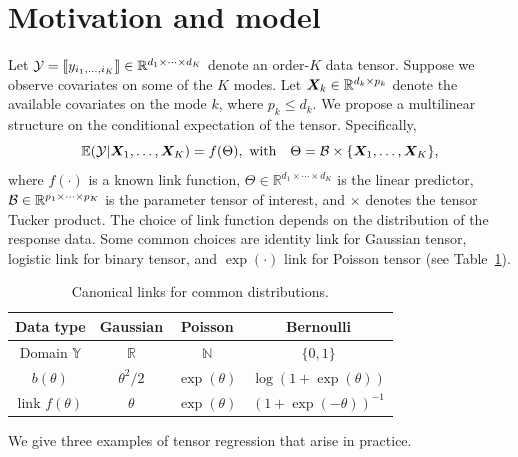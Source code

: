 \documentclass{article}
\theoremstyle{plain}
\theoremstyle{definition}
\begin{document}
\section{Motivation and model}\label{sec:model}
Let $\mathcal{Y}=\llbracket y_{i_1,\ldots,i_K} \rrbracket\in\mathbb{R}^{d_1\times \cdots\times d_K}$ denote an order-$K$ data tensor. Suppose we observe covariates on some of the $K$ modes. Let $\bm X_k\in\mathbb{R}^{d_k\times p_k}$ denote the available covariates on the mode $k$, where $p_k\leq d_k$. We propose a multilinear structure on the conditional expectation of the tensor. Specifically, 
\begin{equation}\label{eq:tensormodel}
\mathbb{E}(\mathcal{Y}|\bm X_1,\ldots,\bm X_K)=f(\Theta),\ \text{with}\quad
\Theta =\mathcal{B}\times\{\bm X_1,\ldots,\bm X_K\} ,
\end{equation}
where $f(\cdot)$ is a known link function, $\Theta\in\mathbb{R}^{d_1\times \cdots\times d_K}$ is the linear predictor, $\mathcal{B}\in\mathbb{R}^{p_1\times \cdots \times p_K}$ is the parameter tensor of interest, and $\times$ denotes the tensor Tucker product. The choice of link function depends on the distribution of the response data. Some common choices are identity link for Gaussian tensor, logistic link for binary tensor, and $\exp(\cdot)$ link for Poisson tensor (see Table~\ref{table:link}). 

\begin{table}
\centering
\begin{tabular}{c|ccc}
Data type &Gaussian & Poisson& Bernoulli\\
\hline
Domain $\mathbb{Y}$& $\mathbb{R}$&$\mathbb{N}$&$\{0,1\}$\\
 $b(\theta)$&$\theta^2/2$& $\exp(\theta)$&$\log (1+\exp(\theta))$\\
 link $f(\theta)$&$\theta$&$\exp(\theta)$&$(1+\exp(-\theta))^{-1}$
\end{tabular}
\vspace{.2cm}
\caption{Canonical links for common distributions.}\label{table:link}
\vspace{-.6cm}
\end{table}


We give three examples of tensor regression that arise in practice.
\end{document}
